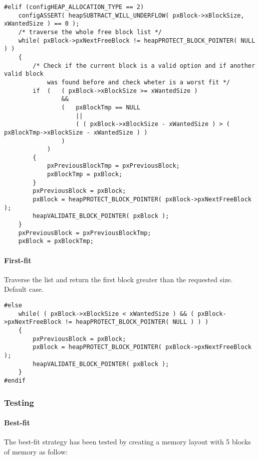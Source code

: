     \begin{codebox}
    \begin{lstlisting}
#elif (configHEAP_ALLOCATION_TYPE == 2)
    configASSERT( heapSUBTRACT_WILL_UNDERFLOW( pxBlock->xBlockSize, xWantedSize ) == 0 );
    /* traverse the whole free block list */
    while( pxBlock->pxNextFreeBlock != heapPROTECT_BLOCK_POINTER( NULL ) )
    {
        /* Check if the current block is a valid option and if another valid block
            was found before and check wheter is a worst fit */
        if  (   ( pxBlock->xBlockSize >= xWantedSize )
                &&
                (   pxBlockTmp == NULL
                    ||
                    ( ( pxBlock->xBlockSize - xWantedSize ) > ( pxBlockTmp->xBlockSize - xWantedSize ) )
                )
            )
        {
            pxPreviousBlockTmp = pxPreviousBlock;
            pxBlockTmp = pxBlock;
        }
        pxPreviousBlock = pxBlock;
        pxBlock = heapPROTECT_BLOCK_POINTER( pxBlock->pxNextFreeBlock );
        heapVALIDATE_BLOCK_POINTER( pxBlock );
    }
    pxPreviousBlock = pxPreviousBlockTmp;
    pxBlock = pxBlockTmp;
    \end{lstlisting}
    \end{codebox}

    \paragraph{First-fit} Traverse the list and return the first block greater than the requested size. Default case.

    \begin{codebox}
    \begin{lstlisting}
#else
    while( ( pxBlock->xBlockSize < xWantedSize ) && ( pxBlock->pxNextFreeBlock != heapPROTECT_BLOCK_POINTER( NULL ) ) )
    {
        pxPreviousBlock = pxBlock;
        pxBlock = heapPROTECT_BLOCK_POINTER( pxBlock->pxNextFreeBlock );
        heapVALIDATE_BLOCK_POINTER( pxBlock );
    }
#endif
    \end{lstlisting}
    \end{codebox}

    \subsubsection{Testing}
    \paragraph{Best-fit} The best-fit strategy has been tested by creating a memory layout with 5 blocks of memory as follow:

